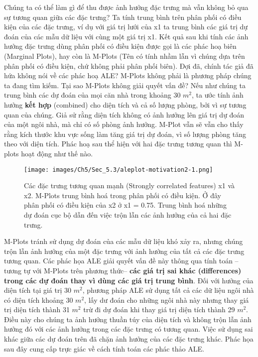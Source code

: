 Chúng ta có thể làm gì để thu được ảnh hưởng đặc trưng mà vẫn không bỏ qua sự tương quan giữa các đặc trưng? Ta tính trung bình trên phân phối có điều kiện của các đặc trưng, ví dụ với giá trị lưới của x1 ta trung bình các giá trị dự đoán của các mẫu dữ liệu với cùng một giá trị x1. Kết quả sau khi tính các ảnh hưởng đặc trưng dùng phân phối có điều kiện được gọi là các phác hoạ biên (Marginal Plots), hay còn là M-Plots (Tên có tính nhầm lẫn vì chúng dựa trên phân phối có điều kiện, chứ không phải phân phối biên). Đợi đã, chính tác giả đã hứa không nói về các phác hoạ ALE? M-Plots không phải là phương pháp chúng ta đang tìm kiếm. Tại sao M-Plots không giải quyết vấn đề? Nếu như chúng ta trung bình các dự đoán của mọi căn nhà trong khoảng 30 $m^2$, ta ước tính ảnh hưởng \textbf{kết hợp} (combined) cho diện tích và cả số lượng phòng, bởi vì sự tương quan của chúng. Giả sử rằng diện tích không có ảnh hưởng lên giá trị dự đoán của một ngôi nhà, mà chỉ có số phòng ảnh hưởng. M-Plot vẫn sẽ vẫn cho thấy rằng kích thước khu vực sống làm tăng giá trị dự đoán, vì số lượng phòng tăng theo với diện tích. Phác hoạ sau thể hiện với hai đặc trưng tương quan thì M-plots hoạt động như thế nào.

\begin{figure*}[h!]
	\centering
	\texttt{[image: images/Ch5/Sec\_5.3/aleplot-motivation2-1.png]}
	\label{fig:5_11}
	\caption{Các đặc trưng tương quan mạnh (Strongly correlated features) x1 và x2. M-Plots trung bình hoá trong phân phối có điều kiện. Ở đây phân phối có điều kiện của x2 ở x1 = 0.75. Trung bình hoá những dự đoán cục bộ dẫn đến việc trộn lẫn các ảnh hưởng của cả hai đặc trưng.}
\end{figure*}


M-Plots tránh sử dụng dự đoán của các mẫu dữ liệu khó xảy ra, nhưng chúng trộn lẫn ảnh hưởng của một đặc trưng với ảnh hưởng của tất cả các đặc trưng tương quan. Các phác họa ALE giải quyết vấn đề này thông qua tính toán – tương tự với M-Plots trên phương thức– \textbf{các giá trị sai khác (differences) trong các dự đoán thay vì dùng các giá trị trung bình}. Đối với 
hưởng của diện tích tại giá trị 30 $m^2$, phương pháp ALE sử dụng tất cả các dữ liệu ngôi nhà có diện tích khoảng 30 $m^2$, lấy dư đoán cho những ngôi nhà này nhưng thay giá trị diện tích thành 31 $m^2$ trừ đi dự đoán khi thay giá trị diện tích thành 29 $m^2$. Điều này cho chúng ta ảnh hưởng thuần túy của diện tích và không trộn lẫn ảnh hưởng đó với các ảnh hưởng trong các đặc trưng có tương quan. Việc sử dụng sai khác giữa các dự đoán trên đã chặn ảnh hưởng của các đặc trưng khác. Phác họa sau đây cung cấp trực giác về cách tính toán các phác thảo ALE.


